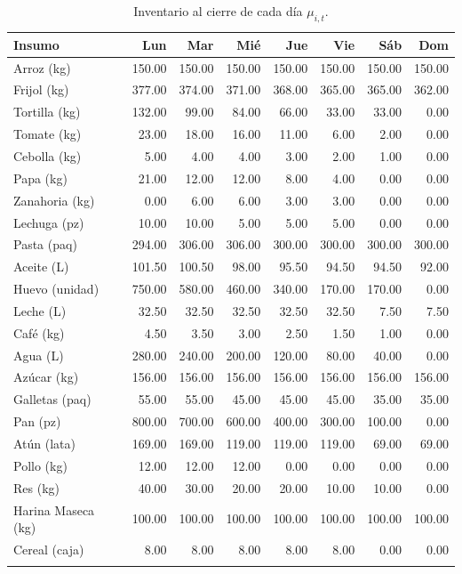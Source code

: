 \documentclass[12pt]{report}
\begin{document}
\begin{longtable}{lrrrrrrr}
\toprule
\textbf{Insumo} & \textbf{Lun} & \textbf{Mar} & \textbf{Mié} & \textbf{Jue} & \textbf{Vie} & \textbf{Sáb} & \textbf{Dom} \\
\midrule
\endhead
\bottomrule
\endfoot
Arroz (kg)        & 150.00 & 150.00 & 150.00 & 150.00 & 150.00 & 150.00 & 150.00 \\
Frijol (kg)       & 377.00 & 374.00 & 371.00 & 368.00 & 365.00 & 365.00 & 362.00 \\
Tortilla (kg)     & 132.00 &  99.00 &  84.00 &  66.00 &  33.00 &  33.00 &   0.00 \\
Tomate (kg)       &  23.00 &  18.00 &  16.00 &  11.00 &   6.00 &   2.00 &   0.00 \\
Cebolla (kg)      &   5.00 &   4.00 &   4.00 &   3.00 &   2.00 &   1.00 &   0.00 \\
Papa (kg)         &  21.00 &  12.00 &  12.00 &   8.00 &   4.00 &   0.00 &   0.00 \\
Zanahoria (kg)    &   0.00 &   6.00 &   6.00 &   3.00 &   3.00 &   0.00 &   0.00 \\
Lechuga (pz)      &  10.00 &  10.00 &   5.00 &   5.00 &   5.00 &   0.00 &   0.00 \\
Pasta (paq)       & 294.00 & 306.00 & 306.00 & 300.00 & 300.00 & 300.00 & 300.00 \\
Aceite (L)        & 101.50 & 100.50 &  98.00 &  95.50 &  94.50 &  94.50 &  92.00 \\
Huevo (unidad)    & 750.00 & 580.00 & 460.00 & 340.00 & 170.00 & 170.00 &   0.00 \\
Leche (L)         &  32.50 &  32.50 &  32.50 &  32.50 &  32.50 &   7.50 &   7.50 \\
Café (kg)         &   4.50 &   3.50 &   3.00 &   2.50 &   1.50 &   1.00 &   0.00 \\
Agua (L)          & 280.00 & 240.00 & 200.00 & 120.00 &  80.00 &  40.00 &   0.00 \\
Azúcar (kg)       & 156.00 & 156.00 & 156.00 & 156.00 & 156.00 & 156.00 & 156.00 \\
Galletas (paq)    &  55.00 &  55.00 &  45.00 &  45.00 &  45.00 &  35.00 &  35.00 \\
Pan (pz)          & 800.00 & 700.00 & 600.00 & 400.00 & 300.00 & 100.00 &   0.00 \\
Atún (lata)       & 169.00 & 169.00 & 119.00 & 119.00 & 119.00 &  69.00 &  69.00 \\
Pollo (kg)        &  12.00 &  12.00 &  12.00 &   0.00 &   0.00 &   0.00 &   0.00 \\
Res (kg)          &  40.00 &  30.00 &  20.00 &  20.00 &  10.00 &  10.00 &   0.00 \\
Harina Maseca (kg)& 100.00 & 100.00 & 100.00 & 100.00 & 100.00 & 100.00 & 100.00 \\
Cereal (caja)     &   8.00 &   8.00 &   8.00 &   8.00 &   8.00 &   0.00 &   0.00 \\
\caption{Inventario al cierre de cada día $\mu_{i,t}$.}
\label{tab:inventario}
\end{longtable}
\end{document}
